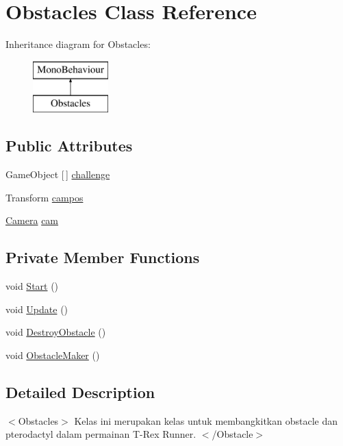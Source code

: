 \hypertarget{class_obstacles}{}\section{Obstacles Class Reference}
\label{class_obstacles}
Inheritance diagram for Obstacles\+:\begin{figure}[H]
\begin{center}
\leavevmode
\includegraphics[height=2.000000cm]{class_obstacles}
\end{center}
\end{figure}
\subsection*{Public Attributes}
\begin{DoxyCompactItemize}
\item 
Game\+Object \mbox{[}$\,$\mbox{]} \hyperlink{class_obstacles_af33a9b1d17f969192cf1c0c5357827c9}{challenge}
\item 
Transform \hyperlink{class_obstacles_ad66e2e7a0d3fbd65343001ad795f8625}{campos}
\item 
\hyperlink{class_camera}{Camera} \hyperlink{class_obstacles_aedd2984958638233b3dcc79fe81b0c29}{cam}
\end{DoxyCompactItemize}
\subsection*{Private Member Functions}
\begin{DoxyCompactItemize}
\item 
void \hyperlink{class_obstacles_a32cfaa5f6c916ff526398a7a42dc8928}{Start} ()
\item 
void \hyperlink{class_obstacles_a1c654788f161aa4b2057201f35b41b9b}{Update} ()
\item 
void \hyperlink{class_obstacles_adabe54fa108d13e6200892eb8019a126}{Destroy\+Obstacle} ()
\item 
void \hyperlink{class_obstacles_aa7b4a059d29fce38f79a38e735621698}{Obstacle\+Maker} ()
\end{DoxyCompactItemize}


\subsection{Detailed Description}
$<$\+Obstacles$>$ Kelas ini merupakan kelas untuk membangkitkan obstacle dan pterodactyl dalam permainan T-\/\+Rex Runner. $<$/\+Obstacle$>$ 

